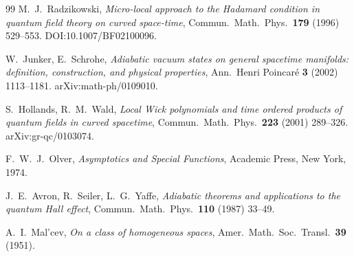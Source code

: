 \documentclass[11pt, a4paper]{article}
\begin{document}
\begin{thebibliography}{99}
M.~J.~Radzikowski,
\textit{Micro-local approach to the Hadamard condition in quantum field
theory on curved space-time},
Commun.\ Math.\ Phys.\ \textbf{179} (1996) 529--553.
DOI:10.1007/BF02100096.

W.~Junker, E.~Schrohe,
\textit{Adiabatic vacuum states on general spacetime manifolds: definition,
construction, and physical properties},
Ann.\ Henri Poincaré \textbf{3} (2002) 1113--1181.
arXiv:math-ph/0109010.

S.~Hollands, R.~M.~Wald,
\textit{Local Wick polynomials and time ordered products of quantum fields
in curved spacetime},
Commun.\ Math.\ Phys.\ \textbf{223} (2001) 289--326.
arXiv:gr-qc/0103074.

F.~W.~J.~Olver,
\textit{Asymptotics and Special Functions},
Academic Press, New York, 1974.

J.~E.~Avron, R.~Seiler, L.~G.~Yaffe,
\textit{Adiabatic theorems and applications to the quantum Hall effect},
Commun.\ Math.\ Phys.\ \textbf{110} (1987) 33--49.

A.~I.~Mal'cev,
\textit{On a class of homogeneous spaces},
Amer.\ Math.\ Soc.\ Transl.\ \textbf{39} (1951).

\end{thebibliography}
\end{document}
